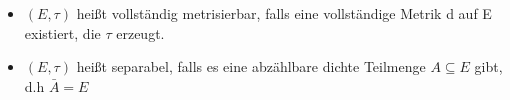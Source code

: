 \mbox{}  
\begin{itemize}
\item $(E,\tau)$ heißt vollständig metrisierbar, falls eine vollständige Metrik d auf E existiert, die $\tau$ erzeugt.
\item $(E,\tau)$ heißt separabel, falls es eine abzählbare dichte Teilmenge $A \subseteq E$ gibt, d.h $\bar{A} = E$ 
\end{itemize}